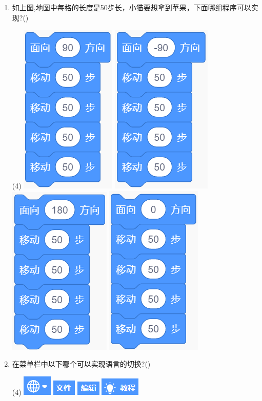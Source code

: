 \documentclass[10pt, a4paper]{article}
\begin{document}
\begin{enumerate}
        \item 如上图,地图中每格的长度是50步长，小猫要想拿到苹果，下面哪组程序可以实现?(\qquad)
        \begin{tasks}(4)
            \task \includegraphics[width=.1\textwidth]{12a.png}
            \task \includegraphics[width=.1\textwidth]{12b.png}
            \task \includegraphics[width=.1\textwidth]{12c.png}
            \task \includegraphics[width=.1\textwidth]{12d.png}
        \end{tasks}

        \item 在菜单栏中以下哪个可以实现语言的切换?(\qquad)
        \begin{tasks}(4)
            \task \includegraphics[width=.05\textwidth]{13a.png}
            \task \includegraphics[width=.05\textwidth]{13b.png}
            \task \includegraphics[width=.05\textwidth]{13c.png}
            \task \includegraphics[width=.07\textwidth]{13d.png}
        \end{tasks}


\end{enumerate}
\end{document}
